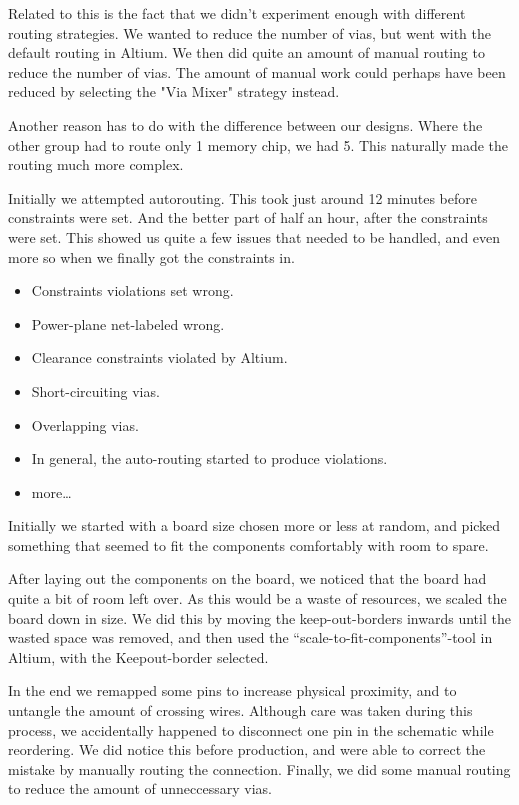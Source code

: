 Related to this is the fact that we didn't experiment enough with different routing strategies. We wanted to reduce the number of vias, but went with the default routing in Altium. We then did quite an amount of manual routing to reduce the number of vias. The amount of manual work could perhaps have been reduced by selecting the "Via Mixer" strategy instead.


Another reason has to do with the difference between our designs. Where the other group had to route only 1 memory chip, we had 5. This naturally made the routing much more complex.

Initially we attempted autorouting. This took just around 12 minutes before constraints were set. And the better part of half an hour, after the constraints were set. This showed us quite a few issues that needed to be handled, and even more so when we finally got the constraints in.

\begin{itemize}
\item Constraints violations set wrong.
\item Power-plane net-labeled wrong.
\item Clearance constraints violated by Altium.
\item Short-circuiting vias.
\item Overlapping vias.
\item In general, the auto-routing started to produce violations.
\item more\ldots
\end{itemize}

Initially we started with a board size chosen more or less at random, and picked something that seemed to fit the components comfortably with room to spare.

After laying out the components on the board, we noticed that the board had quite a bit of room left over. As this would be a waste of resources, we scaled the board down in size. We did this by moving the keep-out-borders inwards until the wasted space was removed, and then used the ``scale-to-fit-components''-tool in Altium, with the Keepout-border selected.

In the end we remapped some pins to increase physical proximity, and to untangle the amount of crossing wires. Although care was taken during this process, we accidentally happened to disconnect one pin in the schematic while reordering. We did notice this before production, and were able to correct the mistake by manually routing the connection. Finally, we did some manual routing to reduce the amount of unneccessary vias.

